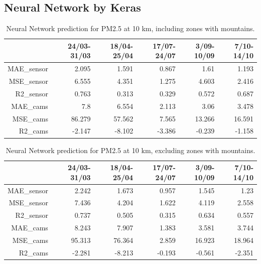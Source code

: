 \subsection{Neural Network by Keras}

\begin{table}[H]
\begin{tabular}{rrrrrr}
\hline
     &   24/03-31/03 &   18/04-25/04 &   17/07-24/07 &   3/09-10/09 &   7/10-14/10 \\
\hline
  MAE\_sensor   &            2.095 &            1.591 &            0.867 &            1.61  &            1.193 \\
  MSE\_sensor   &            6.555 &            4.351 &            1.275 &            4.603 &            2.416 \\
  R2\_sensor    &            0.763 &            0.313 &            0.329 &            0.572 &            0.687 \\
  MAE\_cams     &            7.8   &            6.554 &            2.113 &            3.06  &            3.478 \\
  MSE\_cams     &           86.279 &           57.562 &            7.565 &           13.266 &           16.591 \\
  R2\_cams      &           -2.147 &           -8.102 &           -3.386 &           -0.239 &           -1.158 \\
\hline
\end{tabular}
\caption{Neural Network prediction for PM2.5 at 10 km, including zones with mountains.}
\end{table}

\begin{table}[H]
\begin{tabular}{rrrrrr}
\hline
    &   24/03-31/03 &   18/04-25/04 &   17/07-24/07 &   3/09-10/09 &   7/10-14/10 \\
\hline
  MAE\_sensor   &            2.242 &            1.673 &            0.957 &            1.545 &            1.23  \\
 MSE\_sensor   &            7.436 &            4.204 &            1.622 &            4.119 &            2.558 \\
  R2\_sensor    &            0.737 &            0.505 &            0.315 &            0.634 &            0.557 \\
  MAE\_cams     &            8.243 &            7.907 &            1.383 &            3.581 &            3.744 \\
  MSE\_cams     &           95.313 &           76.364 &            2.859 &           16.923 &           18.964 \\
  R2\_cams      &           -2.281 &           -8.213 &           -0.193 &           -0.561 &           -2.351 \\
\hline
\end{tabular}
\caption{Neural Network prediction for PM2.5 at 10 km, excluding zones with mountains.}
\end{table}

